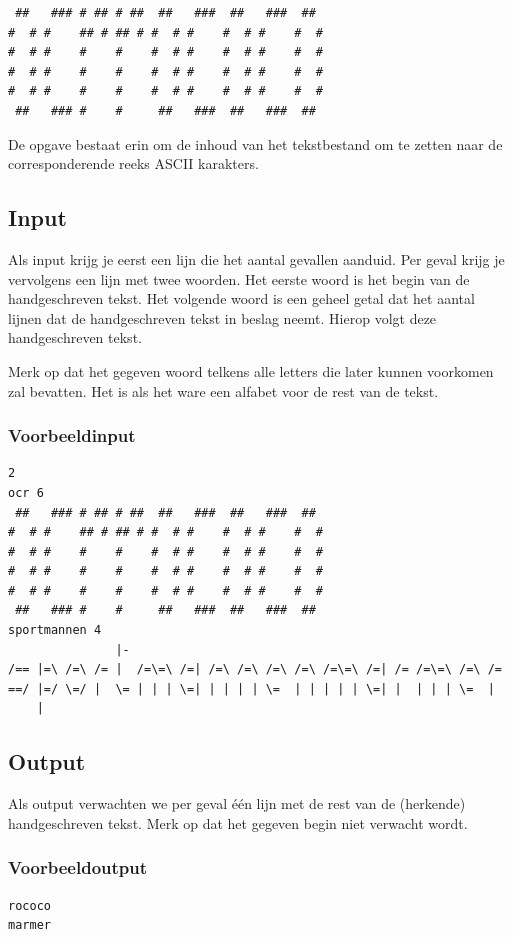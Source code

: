 \begin{verbatim}
 ##   ### # ## # ##  ##   ###  ##   ###  ##
#  # #    ## # ## # #  # #    #  # #    #  #
#  # #    #    #    #  # #    #  # #    #  #
#  # #    #    #    #  # #    #  # #    #  #
#  # #    #    #    #  # #    #  # #    #  #
 ##   ### #    #     ##   ###  ##   ###  ##
\end{verbatim}

De opgave bestaat erin om de inhoud van het tekstbestand om te zetten naar de
corresponderende reeks ASCII karakters.

\subsection*{Input}

Als input krijg je eerst een lijn die het aantal gevallen aanduid. Per geval
krijg je vervolgens een lijn met twee woorden. Het eerste woord is het begin van
de handgeschreven tekst. Het volgende woord is een geheel getal dat het aantal
lijnen dat de handgeschreven tekst in beslag neemt. Hierop volgt deze
handgeschreven tekst.

Merk op dat het gegeven woord telkens alle letters die later kunnen voorkomen
zal bevatten. Het is als het ware een alfabet voor de rest van de tekst.

\subsubsection*{Voorbeeldinput}

\begin{verbatim}
2
ocr 6
 ##   ### # ## # ##  ##   ###  ##   ###  ##
#  # #    ## # ## # #  # #    #  # #    #  #
#  # #    #    #    #  # #    #  # #    #  #
#  # #    #    #    #  # #    #  # #    #  #
#  # #    #    #    #  # #    #  # #    #  #
 ##   ### #    #     ##   ###  ##   ###  ##
sportmannen 4
               |-
/== |=\ /=\ /= |  /=\=\ /=| /=\ /=\ /=\ /=\ /=\=\ /=| /= /=\=\ /=\ /=
==/ |=/ \=/ |  \= | | | \=| | | | | \=  | | | | | \=| |  | | | \=  |
    |
\end{verbatim}

\subsection*{Output}

Als output verwachten we per geval \'e\'en lijn met de rest van de (herkende)
handgeschreven tekst. Merk op dat het gegeven begin niet verwacht wordt.

\subsubsection*{Voorbeeldoutput}

\begin{verbatim}
rococo
marmer
\end{verbatim}


